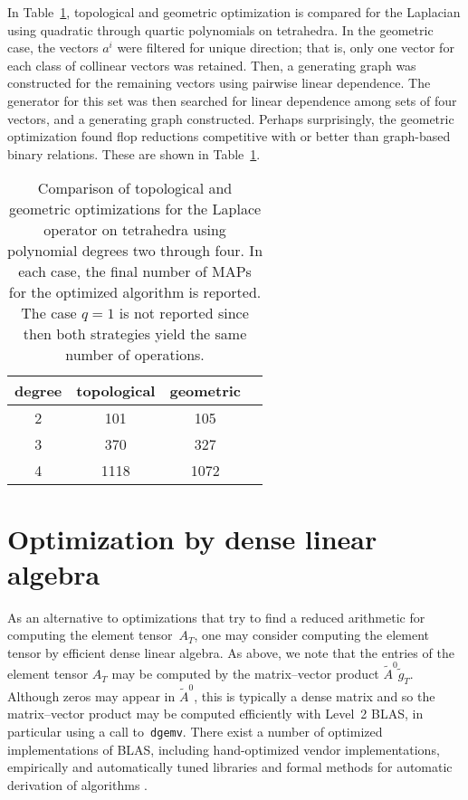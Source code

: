 In Table~\ref{tab:kirby-4:geom}, topological and geometric
optimization is compared for the Laplacian using quadratic through
quartic polynomials on tetrahedra.  In the geometric case, the vectors
$a^i$ were filtered for unique direction; that is, only one vector for
each class of collinear vectors was retained. Then, a generating graph
was constructed for the remaining vectors using pairwise linear
dependence. The generator for this set was then searched for linear
dependence among sets of four vectors, and a generating graph
constructed.  Perhaps surprisingly, the geometric optimization found
flop reductions competitive with or better than graph-based binary
relations. These are shown in Table~\ref{tab:kirby-4:geom}.

\begin{table}
  \begin{center}
    \vspace{2em}
    \begin{tabular}{|c|c|c|c|}
      \hline
      degree & topological & geometric \\
      \hline
      \hline
      2 & 101  & 105   \\
      \hline
      3 & 370  & 327   \\
      \hline
      4 & 1118 & 1072  \\
      \hline
    \end{tabular}
    \vspace{2em}
    \caption{Comparison of topological and geometric optimizations
      for the Laplace operator on tetrahedra using polynomial degrees two
      through four. In each case, the final number of MAPs for the
      optimized algorithm is reported. The case $q=1$ is not reported
      since then both strategies yield the same number of operations.}
  \end{center}
  \label{tab:kirby-4:geom}
\end{table}

\section{Optimization by dense linear algebra}

As an alternative to optimizations that try to find a reduced arithmetic
for computing the element tensor~$A_T$, one may consider computing
the element tensor by efficient dense linear algebra.  As above, we
note that the entries of the element tensor $A_T$ may be computed by
the matrix--vector product $\tilde{A}^0 \tilde{g}_T$. Although zeros
may appear in $\tilde{A}^0$, this is typically a dense matrix and so
the matrix--vector product may be computed efficiently with Level~2
BLAS, in particular using a call to~\texttt{dgemv}. There exist a
number of optimized implementations of BLAS, including hand-optimized
vendor implementations, empirically and automatically tuned libraries
\citep{WhaleyPetitetDongarra2001} and formal methods for automatic
derivation of algorithms \citet{BientinesiGunnelsMyersEtAl2005}.

